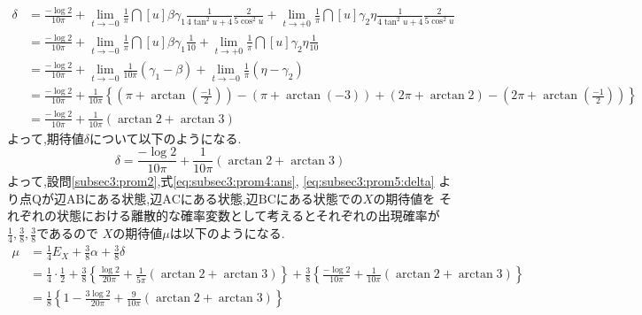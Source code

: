 \documentclass[dvipdfmx,titlepage, 11pt, a4paper]{jsarticle}%
\begin{document}
\begin{enumerate}[(1)]
  \begin{align*}
    \delta 
    &= \frac{-\log 2}{10\pi} + \lim_{t \to -0}\frac{1}{\pi}\dint[u]{\beta}{\gamma_1}{\frac{1}{4\tan^{2}u + 4}\frac{2}{5\cos^{2}u}}
      + \lim_{t \to +0}\frac{1}{\pi}\dint[u]{\gamma_2}{\eta}{\frac{1}{4\tan^{2}u + 4}\frac{2}{5\cos^{2}u}}\\
    &= \frac{-\log 2}{10\pi} + \lim_{t \to -0}\frac{1}{\pi}\dint[u]{\beta}{\gamma_1}{\frac{1}{10}} 
      + \lim_{t \to +0}\frac{1}{\pi}\dint[u]{\gamma_2}{\eta}{\frac{1}{10}}\\
    &= \frac{-\log 2}{10\pi} + \lim_{t \to -0}\frac{1}{10\pi}(\gamma_1 - \beta) + \lim_{t \to -0}\frac{1}{\pi}(\eta - \gamma_2)\\
    &= \frac{-\log 2}{10\pi} + \frac{1}{10\pi}\left\{\left(\pi + \arctan\left(\frac{-1}{2}\right)\right) - (\pi + \arctan(-3))
      + (2\pi + \arctan 2) - \left(2\pi + \arctan\left(\frac{-1}{2}\right)\right)\right\}\\
    &= \frac{-\log 2}{10\pi} + \frac{1}{10\pi}(\arctan 2 + \arctan 3)
  \end{align*}
  よって,期待値$\delta$について以下のようになる.
  \begin{equation}
    \delta = \frac{-\log 2}{10\pi} + \frac{1}{10\pi}(\arctan 2 + \arctan 3)\label{eq:subsec3:prom5:delta}
  \end{equation}
  よって,設問\eqref{subsec3:prom2},式\eqref{eq:subsec3:prom4:ans}, \eqref{eq:subsec3:prom5:delta}
  より点$\mathrm{Q}$が辺$\mathrm{AB}$にある状態,辺$\mathrm{AC}$にある状態,辺$\mathrm{BC}$にある状態での$X$の期待値を
  それぞれの状態における離散的な確率変数として考えるとそれぞれの出現確率が$\frac{1}{4}, \frac{3}{8}, \frac{3}{8}$であるので
  $X$の期待値$\mu$は以下のようになる.
  \begin{align*}
    \mu &= \frac{1}{4}E_{X} + \frac{3}{8}\alpha + \frac{3}{8}\delta\\
        &= \frac{1}{4}\cdot\frac{1}{2} 
          + \frac{3}{8}\left\{\frac{\log 2}{20\pi} + \frac{1}{5\pi}(\arctan 2 + \arctan 3)\right\}
          + \frac{3}{8}\left\{\frac{-\log 2}{10\pi} + \frac{1}{10\pi}(\arctan 2 + \arctan 3)\right\}\\
        &= \frac{1}{8}\left\{1 - \frac{3\log 2}{20\pi} + \frac{9}{10\pi}(\arctan 2 + \arctan 3)\right\}
  \end{align*}
\end{enumerate}
\end{document}
